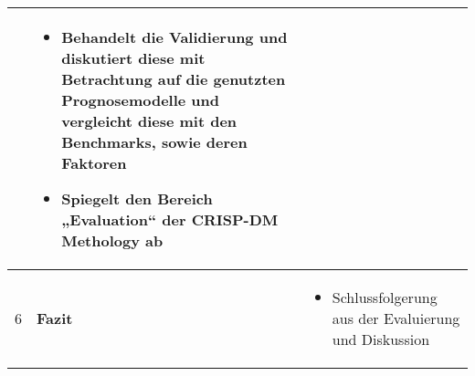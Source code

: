 \begin{table}[H]
\begin{tabularx}{\textwidth}[ht]{|l|X|X|}
        & \begin{itemize}
            \item Behandelt die Validierung und diskutiert diese mit Betrachtung auf 
            die genutzten Prognosemodelle und vergleicht diese mit den Benchmarks, sowie 
            deren Faktoren
            \item Spiegelt den Bereich „Evaluation“ der CRISP-DM Methology ab
        \end{itemize}\\
        \hline\hline
        6 & \textbf{Fazit} & 
        \begin{itemize}
            \item Schlussfolgerung aus der Evaluierung und Diskussion
        \end{itemize}\\
        \hline
    \end{tabularx}\\
    \end{table}